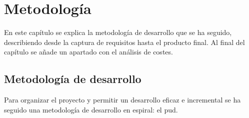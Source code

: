\chapter{Metodología}
\label{cap:metodologia}

En este capítulo se explica la metodología de desarrollo que se ha seguido, describiendo desde la captura de requisitos hasta el producto final. Al final del capítulo se añade un apartado con el análisis de costes.

\section{Metodología de desarrollo}

Para organizar el proyecto y permitir un desarrollo eficaz e incremental se ha seguido una metodología de desarrollo en espiral: el \gls{pud}\cite{pud}\cite{apuntes}.

